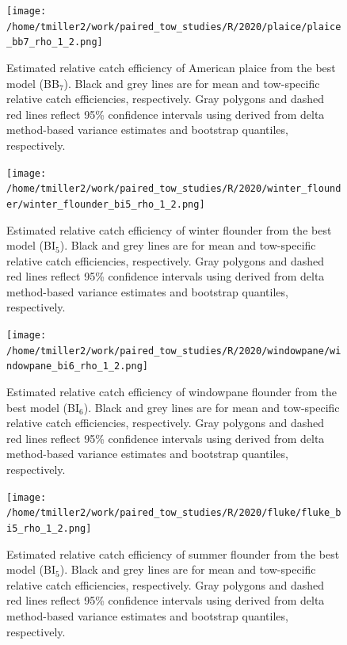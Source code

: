 \documentclass[12pt,letterpaper, leqno]{article}
\begin{document}
\begin{landscape}

\begin{figure}
\caption{Estimated relative catch efficiency of American plaice from the best model (BB$_7$). Black and grey lines are for mean and tow-specific relative catch efficiencies, respectively. Gray polygons and dashed red lines reflect 95\% confidence intervals using derived from delta method-based variance estimates and bootstrap quantiles, respectively.}\label{combined_rhos_plaice}
\begin{center}
\texttt{[image: /home/tmiller2/work/paired\_tow\_studies/R/2020/plaice/plaice\_bb7\_rho\_1\_2.png]}
\end{center}
\end{figure}

\begin{figure}
\caption{Estimated relative catch efficiency of winter flounder from the best model (BI$_5$). Black and grey lines are for mean and tow-specific relative catch efficiencies, respectively. Gray polygons and dashed red lines reflect 95\% confidence intervals using derived from delta method-based variance estimates and bootstrap quantiles, respectively.}\label{combined_rhos_winter}
\begin{center}
\texttt{[image: /home/tmiller2/work/paired\_tow\_studies/R/2020/winter\_flounder/winter\_flounder\_bi5\_rho\_1\_2.png]}
\end{center}
\end{figure}

\begin{figure}
\caption{Estimated relative catch efficiency of windowpane flounder from the best model (BI$_6$). Black and grey lines are for mean and tow-specific relative catch efficiencies, respectively. Gray polygons and dashed red lines reflect 95\% confidence intervals using derived from delta method-based variance estimates and bootstrap quantiles, respectively.}\label{combined_rhos_windowpane}
\begin{center}
\texttt{[image: /home/tmiller2/work/paired\_tow\_studies/R/2020/windowpane/windowpane\_bi6\_rho\_1\_2.png]}
\end{center}
\end{figure}

\begin{figure}
\caption{Estimated relative catch efficiency of summer flounder from the best model (BI$_5$). Black and grey lines are for mean and tow-specific relative catch efficiencies, respectively. Gray polygons and dashed red lines reflect 95\% confidence intervals using derived from delta method-based variance estimates and bootstrap quantiles, respectively.}\label{combined_rhos_fluke}
\begin{center}
\texttt{[image: /home/tmiller2/work/paired\_tow\_studies/R/2020/fluke/fluke\_bi5\_rho\_1\_2.png]}
\end{center}
\end{figure}


\end{landscape}
\end{document}
